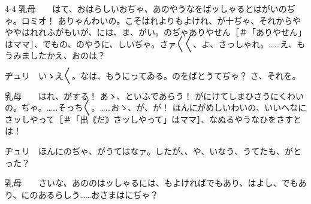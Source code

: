 \documentclass[tate,paper=b6j,jafontsize=9pt]{jlreq}
\begin{document}
\begin{azconvIndented}{4\zw}{-4\zw}
乳母　　はて、おはらしいおぢゃ、あのやうなをばッしゃるとはがいのぢゃ。ロミオ！ ありゃんわいの。こそはれよりもよけれ、が十ぢゃ、それからやややはれれふがもいが、には、ま、がい。のぢゃありやせん{\small ［＃「ありやせん」はママ］}、でもの、のやうに、しいぢゃ。さァ{〳〵}{〳〵}、よ、さっしゃれ。……え、もうみましたかえ、おのは？

ヂュリ　いゝえ{〳〵}。なは、もうにってゐる。のをばとうてぢゃ？ さ、それを。

乳母　　はれ、がする！ あゝ、といふであらう！ がにけてしまひさうにくわいの。ぢゃ。……そっち{〳〵}。……おゝ、が、が！ ほんにがめしいわいの、いいへなにさッしやって{\small ［＃「出《だ》さッしやって」はママ］}、なぬるやうなひをさすとは！

ヂュリ　ほんにのぢゃ、がうてはなァ。したが、、や、いなう、うてたも、がとった？

乳母　　さいな、あののはッしゃるには、もよければでもあり、はよし、でもあり、にのあるらしう……おさまはにぢゃ？


\end{azconvIndented}
\end{document}
